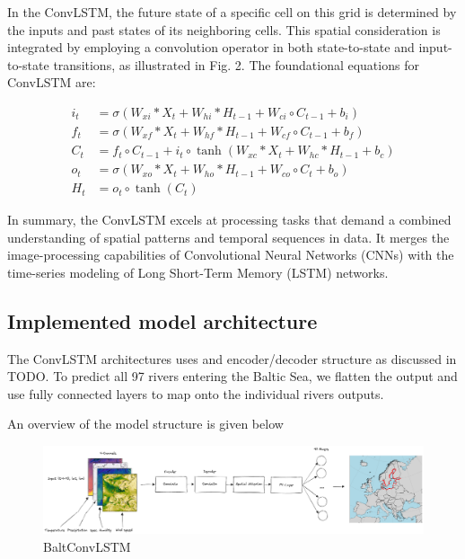 \documentclass[
]{agujournal2019}
\begin{document}
In the ConvLSTM, the future state of a specific cell on this grid is
determined by the inputs and past states of its neighboring cells. This
spatial consideration is integrated by employing a convolution operator
in both state-to-state and input-to-state transitions, as illustrated in
Fig. 2. The foundational equations for ConvLSTM are:

\[
\begin{aligned}
i_t &= \sigma(W_{xi} \ast X_t + W_{hi} \ast H_{t-1} + W_{ci} \circ C_{t-1} + b_i) \\
f_t &= \sigma(W_{xf} \ast X_t + W_{hf} \ast H_{t-1} + W_{cf} \circ C_{t-1} + b_f) \\
C_t &= f_t \circ C_{t-1} + i_t \circ \tanh(W_{xc} \ast X_t + W_{hc} \ast H_{t-1} + b_c) \\
o_t &= \sigma(W_{xo} \ast X_t + W_{ho} \ast H_{t-1} + W_{co} \circ C_t + b_o) \\
H_t &= o_t \circ \tanh(C_t)
\end{aligned}
\]

In summary, the ConvLSTM excels at processing tasks that demand a
combined understanding of spatial patterns and temporal sequences in
data. It merges the image-processing capabilities of Convolutional
Neural Networks (CNNs) with the time-series modeling of Long Short-Term
Memory (LSTM) networks.

\hypertarget{implemented-model-architecture}{%
\subsection{Implemented model
architecture}\label{implemented-model-architecture}}

The ConvLSTM architectures uses and encoder/decoder structure as
discussed in TODO. To predict all 97 rivers entering the Baltic Sea, we
flatten the output and use fully connected layers to map onto the
individual rivers outputs.

An overview of the model structure is given below

\begin{figure}

{\centering \includegraphics{model_structure.png}

}

\caption{\label{fig-baltNet}BaltConvLSTM}

\end{figure}
\end{document}
